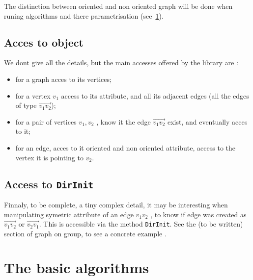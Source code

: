 The distinction between oriented and non oriented graph will be done when runing algorithms and there
parametrisation (see~\ref{Graph:Algo}).

\subsection{Acces to object}

We dont give all the details, but the main accesses offered by the library are :

\begin{itemize}
    \item for a graph acces to its vertices;

    \item for a vertex $v_1$ access to its attribute, and all its adjacent edges
          (all the edges of type  $\overrightarrow{v_1v_2}$);

    \item for a pair of vertices $v_1,v_2$ , know it the edge $\overrightarrow{v_1v_2}$ exist,
          and eventually acces to it;

    \item for an edge, acces to it oriented and non oriented attribute, access to the vertex it is pointing to $v_2$.
\end{itemize}



\subsection{Access to {\tt DirInit}}

Finnaly, to be complete, a tiny complex detail, it may be interesting when manipulating symetric
attribute of an edge $v_1v_2$ , to know if edge  was  created as $\overrightarrow{v_1v_2}$
or $\overrightarrow{v_2v_1}$. This is accessible via the method {\tt DirInit}.  See the (to
be written) section of graph on group, to see a concrete example .



\section{The basic algorithms}
\label{Graph:Algo}

